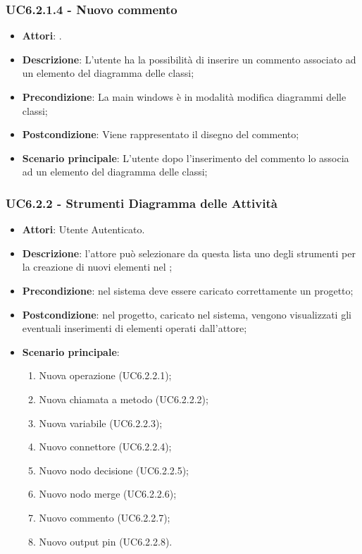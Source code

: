\subsubsection{UC6.2.1.4 - Nuovo commento} 
\label{sssec:UC6.2.1.4} 
\begin{itemize} 
\item \textbf{Attori}: .
\item \textbf{Descrizione}: L'utente ha la possibilità di inserire un commento associato ad un elemento del diagramma delle classi;
\item \textbf{Precondizione}: La main windows è in modalità modifica diagrammi delle classi;
\item \textbf{Postcondizione}: Viene rappresentato il disegno del commento;
\item \textbf{Scenario principale}: L'utente dopo l'inserimento del commento lo associa ad un elemento del diagramma delle classi;\end{itemize} 
\subsubsection{UC6.2.2 - Strumenti Diagramma delle Attività} 
\label{sssec:UC6.2.2} 
\begin{itemize} 
\item \textbf{Attori}: Utente Autenticato.
\item \textbf{Descrizione}: l'attore può selezionare da questa lista uno degli strumenti per la creazione di nuovi elementi nel ;
\item \textbf{Precondizione}: nel sistema deve essere caricato correttamente un progetto;
\item \textbf{Postcondizione}: nel progetto, caricato nel sistema, vengono visualizzati gli eventuali inserimenti di elementi operati dall'attore;
\item \textbf{Scenario principale}: \begin{enumerate}\item Nuova operazione (UC6.2.2.1);\item Nuova chiamata a metodo (UC6.2.2.2);\item Nuova variabile (UC6.2.2.3);\item Nuovo connettore (UC6.2.2.4);\item Nuovo nodo decisione (UC6.2.2.5);\item Nuovo nodo merge (UC6.2.2.6);\item Nuovo commento (UC6.2.2.7);\item Nuovo output pin (UC6.2.2.8). 
 \end{enumerate}
\end{itemize} 
